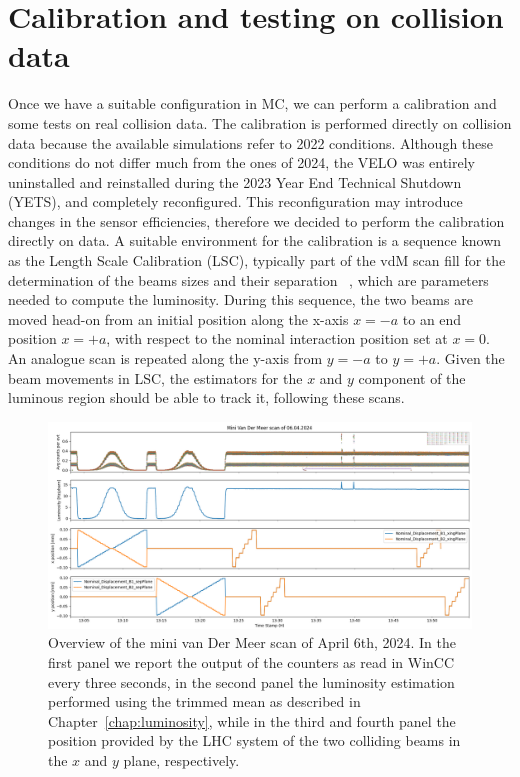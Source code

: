 \section{Calibration and testing on collision data}\label{sec:beamline_calib}
Once we have a suitable configuration in MC, we can perform a calibration and some tests on real collision data. The calibration is performed directly on collision data because the available simulations refer to 2022 conditions. Although these conditions do not differ much from the ones of 2024, the VELO was entirely uninstalled and reinstalled during the 2023 Year End Technical Shutdown (YETS), and completely reconfigured. This reconfiguration may introduce changes in the sensor efficiencies, therefore we decided to perform the calibration directly on data. A suitable environment for the calibration is a sequence known as the Length Scale Calibration (LSC), typically part of the vdM scan fill for the determination of the beams sizes and their separation ~\cite{Balagura_2021}, which are parameters needed to compute the luminosity. During this sequence, the two beams are moved head-on from an initial position along the x-axis $x=-a$ to an end position $x=+a$, with respect to the nominal interaction position set at $x=0$. An analogue scan is repeated along the y-axis from $y=-a$ to $y=+a$. 
Given the beam movements in LSC, the estimators for the $x$ and $y$ component of the luminous region should be able to track it, following these scans.

\begin{figure}
    \centering
    \includegraphics[width=\textwidth]{figures/lumi_with_counters.png}
    \caption{Overview of the mini van Der Meer scan of April 6th, 2024. In the first panel we report the output of the counters as read in WinCC every three seconds, in the second panel the luminosity estimation performed using the trimmed mean as described in Chapter~\ref{chap:luminosity}, while in the third and fourth panel the position provided by the LHC system of the two colliding beams in the $x$ and $y$ plane, respectively.}
    \label{fig:mini-vdm}
\end{figure}

